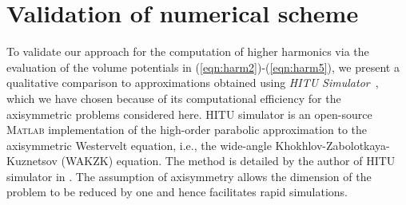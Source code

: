 \documentclass[11pt]{article}
\numberwithin{equation}{section}
\newcommand{\red}[1]{{\color{black} #1}}
\begin{document}
\section{Validation of numerical scheme}
\label{sec:validation}
To validate our approach for the computation of higher harmonics via the 
evaluation of the volume potentials in (\ref{eqn:harm2})-(\ref{eqn:harm5}), we 
present a qualitative  comparison to approximations obtained using 
\textit{HITU Simulator}~\cite{HITUwebpage}, \red{which we have chosen because of 
its computational efficiency for the axisymmetric problems considered here}. HITU simulator is an open-source \textsc{Matlab}
implementation of the high-order parabolic approximation to the axisymmetric 
Westervelt equation, i.e., the wide-angle Khokhlov-Zabolotkaya-Kuznetsov (WAKZK) equation.
The method is detailed by the author of HITU simulator in \cite{soneson2017extending}.
The assumption of axisymmetry allows the dimension of the problem to be reduced 
by one and hence facilitates rapid simulations. 
\end{document}
